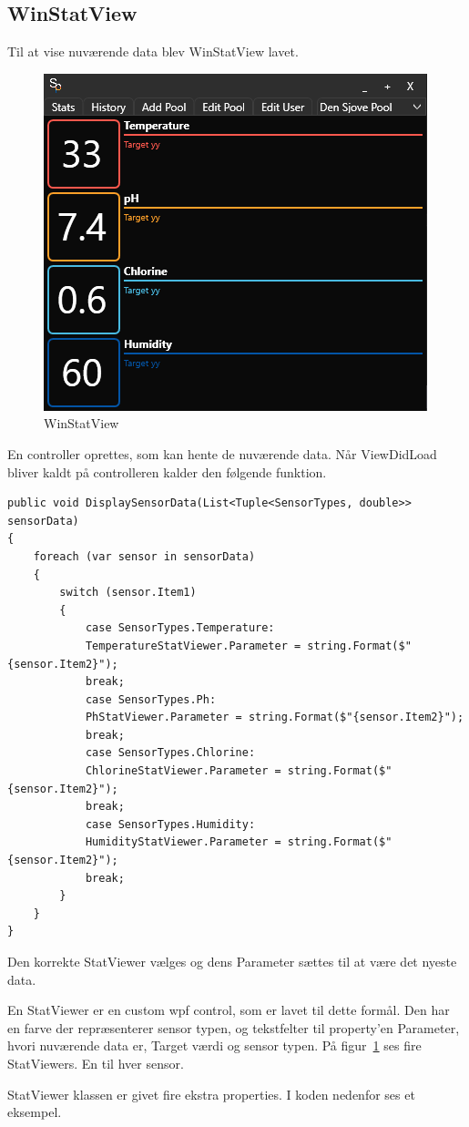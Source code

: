 \subsection{WinStatView}
Til at vise nuværende data blev WinStatView lavet.
\begin{figure}[h]
	\centering
	\includegraphics[width=0.5\linewidth]{figs/implementering/winstatview}
	\caption{WinStatView}
	\label{fig:winstatview}
\end{figure}

En controller oprettes, som kan hente de nuværende data. Når ViewDidLoad bliver kaldt på controlleren kalder den følgende funktion.

\begin{lstlisting}[caption=DisplaySensorData(),label=code:DisplaySensorData]
public void DisplaySensorData(List<Tuple<SensorTypes, double>> sensorData)
{
   	foreach (var sensor in sensorData)
   	{
   		switch (sensor.Item1)
   		{
   			case SensorTypes.Temperature:
   			TemperatureStatViewer.Parameter = string.Format($"{sensor.Item2}");
   			break;
   			case SensorTypes.Ph:
   			PhStatViewer.Parameter = string.Format($"{sensor.Item2}");
   			break;
   			case SensorTypes.Chlorine:
   			ChlorineStatViewer.Parameter = string.Format($"{sensor.Item2}");
   			break;
   			case SensorTypes.Humidity:
   			HumidityStatViewer.Parameter = string.Format($"{sensor.Item2}");
   			break;
   		} 
   	}
}
\end{lstlisting}

Den korrekte StatViewer vælges og dens Parameter sættes til at være det nyeste data.

En StatViewer er en custom wpf control, som er lavet til dette formål. Den har en farve der repræsenterer sensor typen, og tekstfelter til property'en Parameter, hvori nuværende data er, Target værdi og sensor typen. 
På figur~\ref{fig:winstatview} ses fire StatViewers. En til hver sensor. 

StatViewer klassen er givet fire ekstra properties. I koden nedenfor ses et eksempel.

